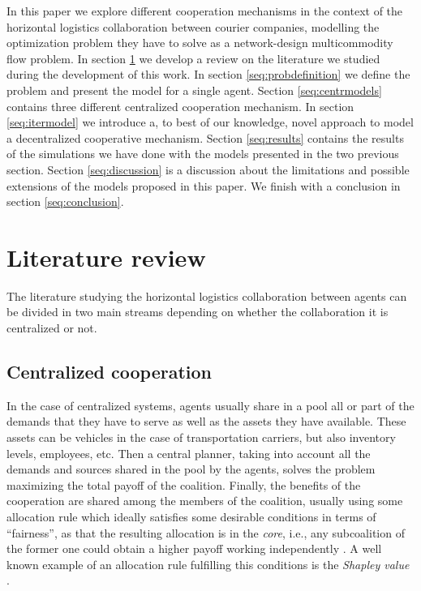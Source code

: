\documentclass[review]{elsarticle}
\begin{document}
In this paper we explore different cooperation mechanisms in the context of the horizontal logistics collaboration between courier companies, modelling the optimization problem they have to solve as a network-design multicommodity flow problem. In section \ref{seq:litreview} we develop a review on the literature we studied during the development of this work. In section \ref{seq:probdefinition} we define the problem and present the model for a single agent. Section \ref{seq:centrmodels} contains three different centralized cooperation mechanism. In section \ref{seq:itermodel} we introduce a, to best of our knowledge, novel approach to model a decentralized cooperative mechanism. Section \ref{seq:results} contains the results of the simulations we have done with the models presented in the two previous section. Section \ref{seq:discussion} is a discussion about the limitations and possible extensions of the models proposed in this paper. We finish with a conclusion in section \ref{seq:conclusion}.



\section{Literature review}\label{seq:litreview}

The literature studying the horizontal logistics collaboration between agents
can be divided in two main streams depending on whether the collaboration it is
centralized or not.

\subsection{Centralized cooperation}

In the case of centralized systems, agents usually share in a pool all or
part of the demands that they have to serve as well as the assets they have
available. These assets can be vehicles in the case of transportation carriers,
but also inventory levels, employees, etc. Then a central planner, taking into
account all the demands and sources shared in the pool by the agents, solves the
problem maximizing the total payoff of the coalition. Finally, the benefits of
the cooperation are shared among the members of the coalition, usually using
some allocation rule which ideally satisfies some desirable conditions in
terms of ``fairness'', as that the resulting allocation is in the \emph{core},
i.e., any subcoalition of the former one could obtain a higher payoff working
independently \cite{GONZALEZ2010}. A well known example of an allocation rule
fulfilling this conditions is the \emph{Shapley value} \cite{SHAPLEY1952}.
\end{document}
